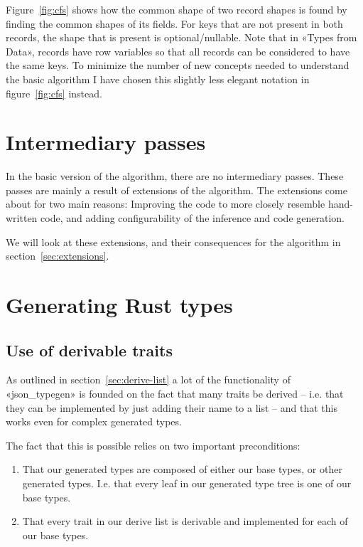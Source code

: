 Figure~\ref{fig:cfs} shows how the common shape of two record shapes is found by finding the common shapes of its fields. For keys that are not present in both records, the shape that is present is optional/nullable. Note that in «Types from Data», records have row variables\cite{row-types} so that all records can be considered to have the same keys. To minimize the number of new concepts needed to understand the basic algorithm I have chosen this slightly less elegant notation in figure~\ref{fig:cfs} instead.

\section{Intermediary passes}

In the basic version of the algorithm, there are no intermediary passes. These passes are mainly a result of extensions of the algorithm. The extensions come about for two main reasons: Improving the code to more closely resemble hand-written code, and adding configurability of the inference and code generation.

We will look at these extensions, and their consequences for the algorithm in section~\ref{sec:extensions}.

\section{Generating Rust types}



\subsection{Use of derivable traits}
\label{sec:use-of-derivable-traits}

As outlined in section~\ref{sec:derive-list} a lot of the functionality of «json_typegen» is founded on the fact that many traits be derived -- i.e. that they can be implemented by just adding their name to a list -- and that this works even for complex generated types.

The fact that this is possible relies on two important preconditions:

\begin{enumerate}
  \item That our generated types are composed of either our base types, or other generated types. I.e. that every leaf in our generated type tree is one of our base types.
  \item That every trait in our derive list is derivable and implemented for each of our base types.
\end{enumerate}


